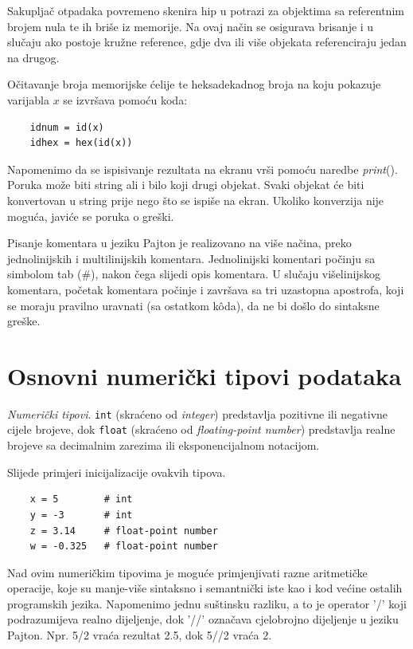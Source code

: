 Sakupljač otpadaka   povremeno skenira hip u potrazi za objektima sa referentnim brojem nula te ih briše   iz memorije. Na ovaj način se osigurava brisanje i u slučaju  ako postoje kružne reference, gdje dva ili više objekata referenciraju jedan na drugog.

Očitavanje broja memorijske ćelije te heksadekadnog broja na koju pokazuje varijabla $x$ se izvršava pomoću koda:
\begin{verbatim}
	idnum = id(x) 
	idhex = hex(id(x)) 
\end{verbatim} 
 Napomenimo da se ispisivanje rezultata na ekranu vrši pomoću naredbe \emph{print}(). Poruka može biti string ali i bilo koji drugi objekat. Svaki objekat će biti konvertovan u string prije nego što se ispiše na ekran. Ukoliko konverzija nije moguća, javiće se poruka o greški. 
 
 Pisanje komentara u jeziku Pajton je realizovano na više načina, preko jednolinijskih i multilinijskih komentara. Jednolinijski komentari počinju sa simbolom tab (\#), nakon čega slijedi opis komentara. U slučaju višelinijskog komentara, početak komentara počinje i završava sa tri uzastopna apostrofa, koji se moraju pravilno uravnati (sa ostatkom k\^oda), da ne bi došlo do sintaksne greške.  
 


\section{Osnovni numerički tipovi podataka}

\textit{Numerički tipovi}. \texttt{int} (skraćeno od \textit{integer}) predstavlja pozitivne ili negativne cijele brojeve, dok \texttt{float} (skraćeno od \textit{floating-point number})  predstavlja realne brojeve sa decimalnim zarezima ili eksponencijalnom notacijom.

Slijede primjeri inicijalizacije ovakvih tipova. 

\begin{verbatim}
	x = 5        # int 
	y = -3       # int 
	z = 3.14     # float-point number
	w = -0.325   # float-point number
\end{verbatim}

Nad ovim numeričkim tipovima  je moguće primjenjivati razne aritmetičke operacije, koje su manje-više sintaksno i semantnički iste kao i kod većine ostalih programskih jezika. Napomenimo jednu suštinsku razliku, a to je operator '/' koji podrazumijeva realno dijeljenje, dok '//' označava cjelobrojno dijeljenje u jeziku Pajton. Npr. 5/2 vraća rezultat 2.5, dok 5//2 vraća 2.  

